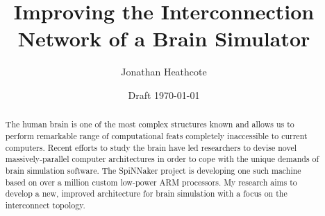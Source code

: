 \documentclass[a4paper,12pt,titlepage]{report}
\title{Improving the Interconnection Network of a Brain Simulator}
\author{Jonathan Heathcote}
\date{Draft \today}
\begin{document}
	
	\maketitle
	
	\begin{abstract}
		
		The human brain is one of the most complex structures known and
		allows us to perform remarkable range of computational feats completely
		inaccessible to current computers. Recent efforts to study the brain have
		led researchers to devise novel massively-parallel computer architectures in
		order to cope with the unique demands of brain simulation software. The
		SpiNNaker project is developing one such machine based on over a million
		custom low-power ARM processors. My research aims to develop a new, improved
		architecture for brain simulation with a focus on the interconnect topology.
		
	\end{abstract}
	
	\tableofcontents
	\listoffigures
	
	
	
	
	
	
	
	
	
	
\end{document}
